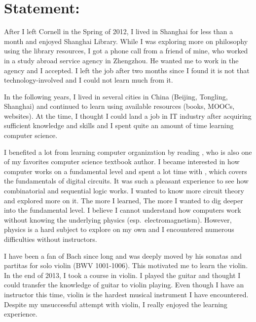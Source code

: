 


\usepackage[font={scriptsize,it}]{caption}
\usepackage{metalogo,alltt,soul,tikz,standalone,wrapfig,csquotes}
\usetikzlibrary{calc}
\usepackage{biblatex} %



\newcommand*{\onum}[1]{{\addfontfeatures{Numbers=OldStyle}#1}}
\newcommand*{\TikZ}{PGF/\kern1bpTi\kern.5bp\textit{k}Z}


	\section*{Statement:}
	After I left Cornell in the Spring of 2012, I lived in Shanghai for less than a month and enjoyed Shanghai Library. While I was exploring more on philosophy using the library resources, I got a phone call from a friend of mine, who worked in a study abroad service agency in Zhengzhou. He wanted me to work in the agency and I accepted. I left the job after two months since I found it is not that technology-involved and I could not learn much from it.
	
	In the following years, I lived in several cities in China (Beijing, Tongling, Shanghai) and continued to learn using available resources (books, MOOCs, websites). At the time, I thought I could land a job in IT industry after acquiring sufficient knowledge and skills and I spent quite an amount of time learning computer science.
	
	I benefited a lot from learning computer organization by reading \textcite{COA8e}, who is also one of my favorites computer science textbook author. I became interested in how computer works on a fundamental level and spent a lot time with \textcite{LCDF}, which covers the fundamentals of digital circuits. It was such a pleasant experience to see how combinatorial and sequential logic works. I wanted to know more circuit theory and explored more on it. The more I learned, The more I wanted to dig deeper into the fundamental level. I believe I cannot understand how computers work without knowing the underlying physics (esp.\ electromagnetism). However, physics is a hard subject to explore on my own and I encountered numerous difficulties without instructors.
	
	I have been a fan of Bach since long and was deeply moved by his sonatas and partitas for solo violin (BWV 1001-1006). This motivated me to learn the violin. In the end of 2013, I took a course in violin. I played the guitar and thought I could transfer the knowledge of guitar to violin playing. Even though I have an instructor this time, violin is the hardest musical instrument I have encountered. Despite my unsuccessful attempt with violin, I really enjoyed the learning experience.
	
